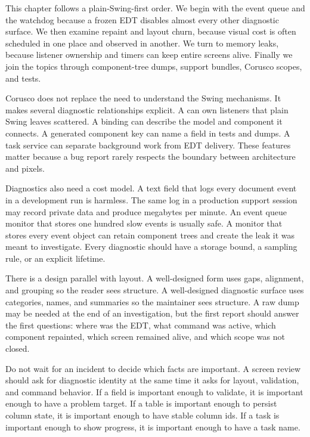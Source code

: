 This chapter follows a plain-Swing-first order. We begin with the event queue and the watchdog because a frozen EDT disables almost every other diagnostic surface. We then examine repaint and layout churn, because visual cost is often scheduled in one place and observed in another. We turn to memory leaks, because listener ownership and timers can keep entire screens alive. Finally we join the topics through component-tree dumps, support bundles, Corusco scopes, and tests.

Corusco does not replace the need to understand the Swing mechanisms. It makes several diagnostic relationships explicit. A  can own listeners that plain Swing leaves scattered. A binding can describe the model and component it connects. A generated component key can name a field in tests and dumps. A task service can separate background work from EDT delivery. These features matter because a bug report rarely respects the boundary between architecture and pixels.

Diagnostics also need a cost model. A text field that logs every document event in a development run is harmless. The same log in a production support session may record private data and produce megabytes per minute. An event queue monitor that stores one hundred slow events is usually safe. A monitor that stores every event object can retain component trees and create the leak it was meant to investigate. Every diagnostic should have a storage bound, a sampling rule, or an explicit lifetime.

There is a design parallel with layout. A well-designed form uses gaps, alignment, and grouping so the reader sees structure. A well-designed diagnostic surface uses categories, names, and summaries so the maintainer sees structure. A raw dump may be needed at the end of an investigation, but the first report should answer the first questions: where was the EDT, what command was active, which component repainted, which screen remained alive, and which scope was not closed.

Do not wait for an incident to decide which facts are important. A screen review should ask for diagnostic identity at the same time it asks for layout, validation, and command behavior. If a field is important enough to validate, it is important enough to have a problem target. If a table is important enough to persist column state, it is important enough to have stable column ids. If a task is important enough to show progress, it is important enough to have a task name.

